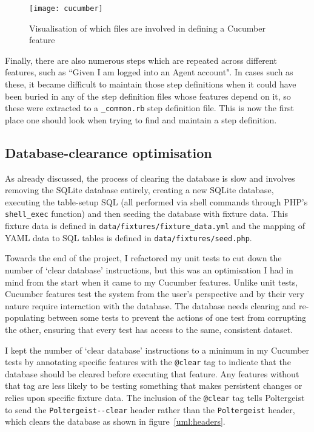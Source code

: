 \begin{figure}[h!]
  \centering
    \ifimages
    \texttt{[image: cucumber]}
    \fi
  \caption{Visualisation of which files are involved in defining a Cucumber feature}
  \label{uml:cucumber}
\end{figure}

Finally, there are also numerous steps which are repeated across different features, such as ``Given I am logged into an Agent account". In cases such as these, it became difficult to maintain those step definitions when it could have been buried in any of the step definition files whose features depend on it, so these were extracted to a \lstinline{_common.rb} step definition file. This is now the first place one should look when trying to find and maintain a step definition.

\subsection{Database-clearance optimisation}

As already discussed, the process of clearing the database is slow and involves removing the SQLite database entirely, creating a new SQLite database, executing the table-setup SQL (all performed via shell commands through PHP's \lstinline{shell_exec} function) and then seeding the database with fixture data. This fixture data is defined in \lstinline{data/fixtures/fixture_data.yml} and the mapping of YAML data to SQL tables is defined in \lstinline{data/fixtures/seed.php}.

Towards the end of the project, I refactored my unit tests to cut down the number of `clear database' instructions, but this was an optimisation I had in mind from the start when it came to my Cucumber features. Unlike unit tests, Cucumber features test the system from the user's perspective and by their very nature require interaction with the database. The database needs clearing and re-populating between some tests to prevent the actions of one test from corrupting the other, ensuring that every test has access to the same, consistent dataset.

I kept the number of `clear database' instructions to a minimum in my Cucumber tests by annotating specific features with the \lstinline{@clear} tag to indicate that the database should be cleared before executing that feature. Any features without that tag are less likely to be testing something that makes persistent changes or relies upon specific fixture data. The inclusion of the \lstinline{@clear} tag tells Poltergeist to send the \lstinline{Poltergeist--clear} header rather than the \lstinline{Poltergeist} header, which clears the database as shown in figure~\ref{uml:headers}.

